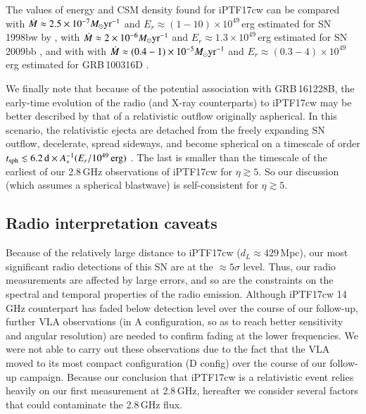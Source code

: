 \documentclass[twocolumn]{emulateapj}
\begin{document}
The values of energy and CSM density found for iPTF17cw can be compared with  $\dot{M}\approx2.5\times10^{-7}M_{\odot}{\rm yr}^{-1}$ and $E_r\approx (1-10)\times10^{49}$\,erg estimated for SN\,1998bw by \citep{Li1999}, with $\dot{M}\approx2\times10^{-6}M_{\odot}{\rm yr}^{-1}$ and $E_r\approx 1.3\times10^{49}$\,erg estimated for SN\,2009bb \citep{Soderberg2010}, and with  with $\dot{M}\approx(0.4-1)\times10^{-5}M_{\odot}{\rm yr}^{-1}$ and $E_r\approx (0.3-4)\times10^{49}$\,erg estimated for GRB\,100316D \citep{Margutti2013}. 

We finally note that because of the potential association with GRB\,161228B, the early-time evolution of the radio (and X-ray counterparts) to iPTF17cw may be better described by that of a relativistic outflow originally aspherical. In this scenario, the relativistic ejecta are detached from the freely expanding SN outflow, decelerate, spread sideways, and become spherical on a timescale of order $t_{\rm sph}\lesssim 6.2\,{\rm d}\times A^{-1}_{*}(E_{r}/10^{49}{\rm\,erg})$ \citep{Waxman2004}. The last is smaller than the timescale of the  earliest of our 2.8\,GHz observations of iPTF17cw for $\eta\gtrsim 5 $. So our discussion (which assumes a spherical blastwave) is self-consistent for $\eta \gtrsim 5$.


\subsection{Radio interpretation caveats}
Because of the relatively large distance to iPTF17cw ($d_L\approx 429$\,Mpc), our most significant radio detections of this SN are at the $\approx 5\sigma$ level. Thus, our radio measurements are affected by large errors, and so are the constraints on the spectral and temporal properties of the radio emission. Although iPTF17cw 14\,GHz counterpart has faded below detection level over the course of our follow-up, further VLA observations (in A configuration, so as to reach better sensitivity and angular resolution) are needed to confirm fading at the lower frequencies. We were not able to carry out these observations due to the fact that the VLA moved to its most compact configuration (D config) over the course of our follow-up campaign. Because our conclusion that iPTF17cw is a relativistic event relies heavily on our first measurement at 2.8\,GHz, hereafter we consider several factors that could contaminate the 2.8\,GHz flux.
\end{document}
